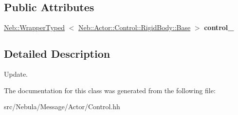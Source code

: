 \subsection*{\-Public \-Attributes}
\begin{DoxyCompactItemize}
\item 
\hypertarget{classNeb_1_1Message_1_1Actor_1_1Control_1_1RigidBody_1_1Update_ae8ceff2f362b8b5273b158bf9ba15e6f}{\hyperlink{classNeb_1_1WrapperTyped}{\-Neb\-::\-Wrapper\-Typed}\*
$<$ \hyperlink{classNeb_1_1Actor_1_1Control_1_1RigidBody_1_1Base}{\-Neb\-::\-Actor\-::\-Control\-::\-Rigid\-Body\-::\-Base} $>$ {\bfseries control\-\_\-}}\label{classNeb_1_1Message_1_1Actor_1_1Control_1_1RigidBody_1_1Update_ae8ceff2f362b8b5273b158bf9ba15e6f}

\end{DoxyCompactItemize}


\subsection{\-Detailed \-Description}
\-Update. 

\-The documentation for this class was generated from the following file\-:\begin{DoxyCompactItemize}
\item 
src/\-Nebula/\-Message/\-Actor/\-Control.\-hh\end{DoxyCompactItemize}

